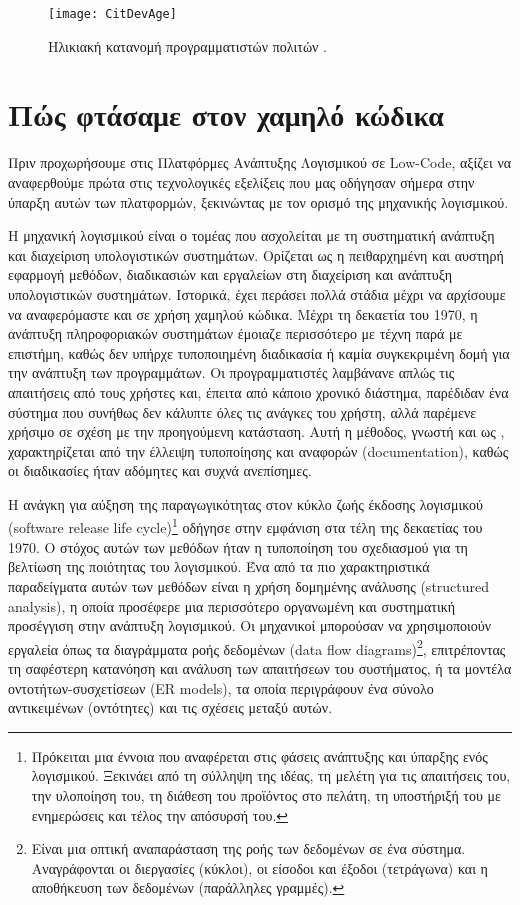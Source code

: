                     \begin{figure}[h!] \noindent \centering
                        \texttt{[image: CitDevAge]}
                        \caption{Ηλικιακή κατανομή προγραμματιστών πολιτών \cite{CitDevTrackVia}.}
                        \label{fig:CitDevAge}
                    \end{figure}


    \section{Πώς φτάσαμε στον χαμηλό κώδικα}
        Πριν προχωρήσουμε στις Πλατφόρμες Ανάπτυξης Λογισμικού σε Low-Code, αξίζει να αναφερθούμε πρώτα στις τεχνολογικές εξελίξεις που μας οδήγησαν σήμερα στην ύπαρξη αυτών των πλατφορμών, ξεκινώντας με τον ορισμό της μηχανικής λογισμικού.

        Η μηχανική λογισμικού είναι ο τομέας που ασχολείται με τη συστηματική ανάπτυξη και διαχείριση υπολογιστικών συστημάτων. Ορίζεται ως η πειθαρχημένη και αυστηρή εφαρμογή μεθόδων, διαδικασιών και εργαλείων στη διαχείριση και ανάπτυξη υπολογιστικών συστημάτων. Ιστορικά, έχει περάσει πολλά στάδια μέχρι να αρχίσουμε να αναφερόμαστε και σε χρήση χαμηλού κώδικα. Μέχρι τη δεκαετία του 1970, η ανάπτυξη πληροφοριακών συστημάτων έμοιαζε περισσότερο με τέχνη παρά με επιστήμη, καθώς δεν υπήρχε τυποποιημένη διαδικασία ή καμία συγκεκριμένη δομή για την ανάπτυξη των προγραμμάτων. Οι προγραμματιστές λαμβάνανε απλώς τις απαιτήσεις από τους χρήστες και, έπειτα από κάποιο χρονικό διάστημα, παρέδιδαν ένα σύστημα που συνήθως δεν κάλυπτε όλες τις ανάγκες του χρήστη, αλλά παρέμενε χρήσιμο σε σχέση με την προηγούμενη κατάσταση. Αυτή η μέθοδος, γνωστή και ως , χαρακτηρίζεται από την έλλειψη τυποποίησης και αναφορών (documentation), καθώς οι διαδικασίες ήταν αδόμητες και συχνά ανεπίσημες.

        Η ανάγκη για αύξηση της παραγωγικότητας στον κύκλο ζωής έκδοσης λογισμικού (software release life cycle)\footnote{Πρόκειται μια έννοια που αναφέρεται στις φάσεις ανάπτυξης και ύπαρξης ενός λογισμικού. Ξεκινάει από τη σύλληψη της ιδέας, τη μελέτη για τις απαιτήσεις του, την υλοποίηση του, τη διάθεση του προϊόντος στο πελάτη, τη υποστήριξή του με ενημερώσεις και τέλος την απόσυρσή του.} οδήγησε στην εμφάνιση  στα τέλη της δεκαετίας του 1970. Ο στόχος αυτών των μεθόδων ήταν η τυποποίηση του σχεδιασμού για τη βελτίωση της ποιότητας του λογισμικού. Ένα από τα πιο χαρακτηριστικά παραδείγματα αυτών των μεθόδων είναι η χρήση δομημένης ανάλυσης (structured analysis), η οποία προσέφερε μια περισσότερο οργανωμένη και συστηματική προσέγγιση στην ανάπτυξη λογισμικού. Οι μηχανικοί μπορούσαν να χρησιμοποιούν εργαλεία όπως τα διαγράμματα ροής δεδομένων (data flow diagrams)\footnote{Είναι μια οπτική αναπαράσταση της ροής των δεδομένων σε ένα σύστημα. Αναγράφονται οι διεργασίες (κύκλοι), οι είσοδοι και έξοδοι (τετράγωνα) και η αποθήκευση των δεδομένων (παράλληλες γραμμές).}, επιτρέποντας τη σαφέστερη κατανόηση και ανάλυση των απαιτήσεων του συστήματος, ή τα μοντέλα οντοτήτων-συσχετίσεων (ER models), τα οποία περιγράφουν ένα σύνολο αντικειμένων (οντότητες) και τις σχέσεις μεταξύ αυτών.

